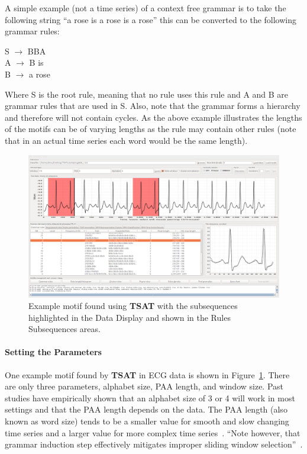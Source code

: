 \documentclass[titlepage, letterpaper, 12pt]{article}
\newcommand\TSAT{\textbf{TSAT}}
\begin{document}
A simple example (not a time series) of a context free grammar is to take the following string ``a rose is a rose is a rose'' this can be converted to the following grammar rules:

\begin{center}
	S \(\rightarrow\) BBA\\
	A \(\rightarrow\) B is\\
	B \(\rightarrow\) a rose\\
\end{center}
Where S is the root rule, meaning that no rule uses this rule and A and B are grammar rules that are used in S. Also, note that the grammar forms a hierarchy and therefore will not contain cycles.  As the above example illustrates the lengths of the motifs can be of varying lengths as the rule may contain other rules (note that in an actual time series each word would be the same length).
\begin{figure}[H]
	\includegraphics[width=\textwidth]{pictures/TSAT-example-motif}
	\caption{Example motif found using {\TSAT} with the subsequences highlighted in the Data Display and shown in the Rules Subsequences areas.}
	\label{fig:tsat-example-motif}
\end{figure}
\paragraph{Setting the Parameters}One example motif found by {\TSAT} in ECG data is shown in Figure~\ref{fig:tsat-example-motif}.  There are only three parameters, alphabet size, PAA length, and window size.  Past studies have empirically shown that an alphabet size of 3 or 4 will work in most settings and that the PAA length depends on the data.  The PAA length (also known as word size) tends to be a smaller value for smooth and slow changing time series and a larger value for more complex time series~\cite{keogh2004hot}. ``Note however, that grammar induction step effectively mitigates improper sliding window selection''~\cite{motifSite}.
\end{document}
